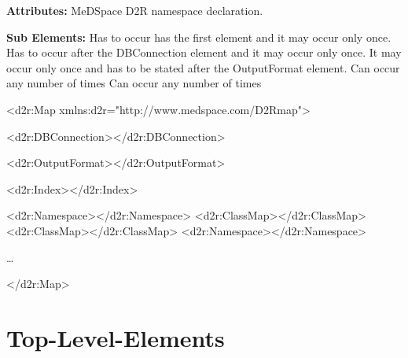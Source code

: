 \textbf{Attributes:} \newline
{}
MeDSpace D2R namespace declaration.
\EndAttribute

\textbf{Sub Elements:} \newline
{}
Has to occur has the first element and it may occur only once. 
\EndAttribute
{}
Has to occur after the DBConnection element and it may occur only once. 
\EndAttribute
{}
It may occur only once and has to be stated after the OutputFormat element. 
\EndAttribute
{}
Can occur any number of times
\EndAttribute
{}
Can occur any number of times
\EndAttribute

\begin{ExampleBox}
	<d2r:Map xmlns:d2r="http://www.medspace.com/D2Rmap">
		\begin{indention}{1cm}
		 \newline
		<d2r:DBConnection></d2r:DBConnection>
		
		 \newline
		<d2r:OutputFormat></d2r:OutputFormat>
		
		\newline
		<d2r:Index></d2r:Index>

		\newline
		<d2r:Namespace></d2r:Namespace>\newline
		<d2r:ClassMap></d2r:ClassMap>\newline
		<d2r:ClassMap></d2r:ClassMap>\newline
		<d2r:Namespace></d2r:Namespace>
		\begin{indention}{2cm}
			\ldots
		\end{indention}		
		
		\end{indention}
	</d2r:Map>
\end{ExampleBox}


\section{Top-Level-Elements}